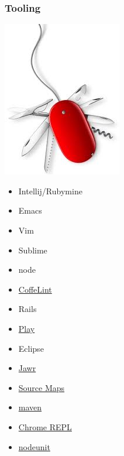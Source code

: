 \documentclass{beamer}
\begin{document}
\begin{frame}
  \frametitle{Tooling}
    \includegraphics[scale=.40]{tooling}
  \begin{multicols}{2}
  \begin{itemize}
    \item Intellij/Rubymine
    \item Emacs
    \item Vim
    \item Sublime
    \item node
    \item \href{http://www.coffeelint.org/}{CoffeLint}
    \item Rails
    \item \href{http://www.playframework.com/documentation/2.0/AssetsCoffeeScript}{Play}
    \item Eclipse
    \item \href{https://jawr.java.net/}{Jawr}
    \item
      \href{http://www.html5rocks.com/en/tutorials/developertools/sourcemaps/}{Source
      Maps}
    \item \href{https://github.com/talios/coffee-maven-plugin}{maven}
    \item 
      \href{https://chrome.google.com/webstore/detail/coffeereplconsole/eoifmnkmfmjellmlicakeocfjmhdjgfl}{Chrome
        REPL}
    \item \href{https://github.com/caolan/nodeunit}{nodeunit}

  \end{itemize}
\end{multicols}
\end{frame}
\end{document}
